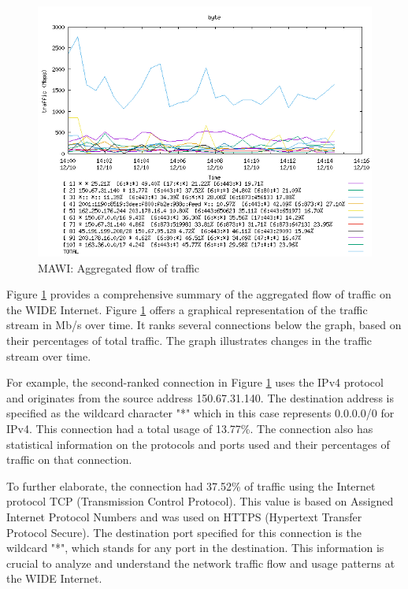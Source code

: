 \documentclass[sigconf,authorversion,nonacm]{acmart}
\begin{document}
\begin{figure}
        \centering
        \includegraphics[width=1\linewidth]{MAWI/MAWI 2023-12-10 aggregated analysis byte.png}
        \caption{MAWI: Aggregated flow of traffic}
        \label{MAWI: Aggregated Flow Byte}
\end{figure}

Figure \ref{MAWI: Aggregated Flow Byte} provides a comprehensive summary of the aggregated flow of traffic on the WIDE Internet. Figure \ref{MAWI: Aggregated Flow Byte} offers a graphical representation of the traffic stream in Mb/s over time. It ranks several connections below the graph, based on their percentages of total traffic. The graph illustrates changes in the traffic stream over time.

For example, the second-ranked connection in Figure \ref{MAWI: Aggregated Flow Byte} uses the IPv4 protocol and originates from the source address 150.67.31.140. The destination address is specified as the wildcard character "*" which in this case represents 0.0.0.0/0 for IPv4. This connection had a total usage of 13.77\%. The connection also has statistical information on the protocols and ports used and their percentages of traffic on that connection. 

To further elaborate, the connection had 37.52\% of traffic using the Internet protocol TCP (Transmission Control Protocol). This value is based on Assigned Internet Protocol Numbers and was used on HTTPS (Hypertext Transfer Protocol Secure). The destination port specified for this connection is the wildcard "*", which stands for any port in the destination. This information is crucial to analyze and understand the network traffic flow and usage patterns at the WIDE Internet.
\end{document}

